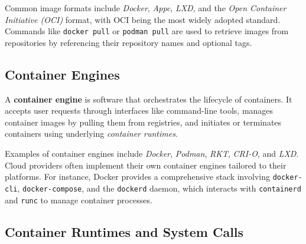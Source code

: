 
Common image formats include \textit{Docker}, \textit{Appc}, \textit{LXD}, and the \textit{Open Container Initiative (OCI)} format, with OCI being the most widely adopted standard. Commands like \texttt{docker pull} or \texttt{podman pull} are used to retrieve images from repositories by referencing their repository names and optional tags.


\subsection{Container Engines}

A \textbf{container engine} is software that orchestrates the lifecycle of containers. It accepts user requests through interfaces like command-line tools, manages container images by pulling them from registries, and initiates or terminates containers using underlying \textit{container runtimes}.


Examples of container engines include \textit{Docker}, \textit{Podman}, \textit{RKT}, \textit{CRI-O}, and \textit{LXD}. Cloud providers often implement their own container engines tailored to their platforms. For instance, Docker provides a comprehensive stack involving \texttt{docker-cli}, \texttt{docker-compose}, and the \texttt{dockerd} daemon, which interacts with \texttt{containerd} and \texttt{runc} to manage container processes.

\subsection{Container Runtimes and System Calls}


